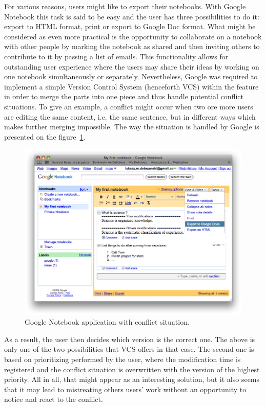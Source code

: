 For various reasons, users might like to export their notebooks. With Google Notebook this task is said to be easy and the user has three possibilities to do it: export to HTML format, print or export to Google Doc format. What might be considered as even more practical is the opportunity to collaborate on a notebook with other people by marking the notebook as shared and then inviting others to contribute to it by passing a list of emails. This functionality allows for outstanding user experience where the users may share their ideas by working on one notebook simultaneously or separately. Nevertheless, Google was required to implement a simple Version Control System (henceforth VCS) within the feature in order to merge the parts into one piece and thus handle potential conflict situations. To give an example, a conflict might occur when two ore more users are editing the same content, i.e. the same sentence, but in different ways which makes further merging impossible. The way the situation is handled by Google is presented on the figure~\ref{fig:google_notebook}. 
\begin{figure}[ht]
\begin{center}
\includegraphics[scale=0.38]{img/google_notebook_conflict.png}
\caption{Google Notebook application with conflict situation.}
\label{fig:google_notebook}
\end{center}
\end{figure}
As a result, the user then decides which version is the correct one. The above is only one of the two possibilities that VCS offers in that case. The second one is based on prioritizing performed by the user, where the modification time is registered and the conflict situation is overwritten with the version of the highest priority. All in all, that might appear as an interesting solution, but it also seems that it may lead to mistreating others users' work without an opportunity to notice and react to the conflict.

